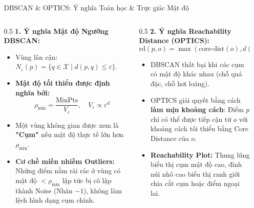\documentclass[aspectratio=169,10pt]{beamer}
\begin{document}
\begin{frame}{DBSCAN \& OPTICS: Ý nghĩa Toán học \& Trực giác Mật độ}
  \small
  \begin{columns}[T]
    \begin{column}{0.5\textwidth}
      \textbf{1. Ý nghĩa Mật độ Ngưỡng DBSCAN:}
      \begin{itemize}\setlength{\itemsep}{1.5pt}
        \item Vùng lân cận: $N_\varepsilon(p) = \{q \in \mathcal{X} \mid d(p, q) \le \varepsilon\}$.
        \item \textbf{Mật độ tối thiểu được định nghĩa bởi:}
          $$\rho_{\min} = \frac{\text{MinPts}}{V_\varepsilon}, \quad V_\varepsilon \propto \varepsilon^d$$
        \item Một vùng không gian được xem là \textbf{"Cụm"} nếu mật độ thực tế lớn hơn $\rho_{\min}$.
        \item \textbf{Cơ chế miễn nhiễm Outliers:} Những điểm nằm rải rác ở vùng có mật độ $< \rho_{\min}$ lập tức bị cô lập thành Noise (Nhãn $-1$), không làm lệch hình dạng cụm chính.
      \end{itemize}
    \end{column}
    \begin{column}{0.5\textwidth}
      \textbf{2. Ý nghĩa Reachability Distance (OPTICS):}
      $$\text{rd}(p, o) = \max(\text{core-dist}(o), d(o, p))$$
      \begin{itemize}\setlength{\itemsep}{1.5pt}
        \item DBSCAN thất bại khi các cụm có mật độ khác nhau (chỗ quá đặc, chỗ hơi loãng).
        \item OPTICS giải quyết bằng cách \textbf{làm mịn khoảng cách}: Điểm $p$ chỉ có thể được tiếp cận từ $o$ với khoảng cách tối thiểu bằng Core Distance của $o$.
        \item \textbf{Reachability Plot:} Thung lũng biểu thị cụm mật độ cao, đỉnh núi nhô cao biểu thị ranh giới chia cắt cụm hoặc điểm ngoại lai.
      \end{itemize}
    \end{column}
  \end{columns}
\end{frame}
\end{document}
